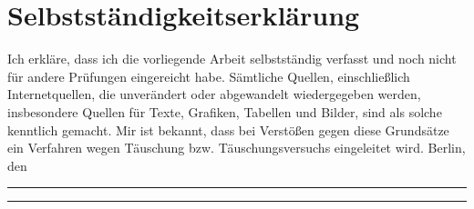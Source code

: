 \documentclass[12pt,a4paper]{memoir}
\begin{document}




\tableofcontents*{}

\mainmatter











\backmatter

\pagebreak

\chapter*{Selbstständigkeitserklärung}
Ich erkläre, dass ich die vorliegende Arbeit selbstständig verfasst und noch nicht für
andere Prüfungen eingereicht habe. Sämtliche Quellen, einschließlich Internetquellen, die unverändert oder
abgewandelt wiedergegeben werden, insbesondere Quellen für Texte, Grafiken, Tabellen und
Bilder, sind als solche kenntlich gemacht. Mir ist bekannt, dass bei Verstößen gegen diese
Grundsätze ein Verfahren wegen Täuschung bzw. Täuschungsversuchs eingeleitet wird.
\bigbreak
Berlin, den \parbox[t]{.2\linewidth}{\rule[-3pt]{\linewidth}{.4pt}} \hfill \parbox[t]{.3\linewidth}{\rule[-3pt]{\linewidth}{.4pt}}
\end{document}
